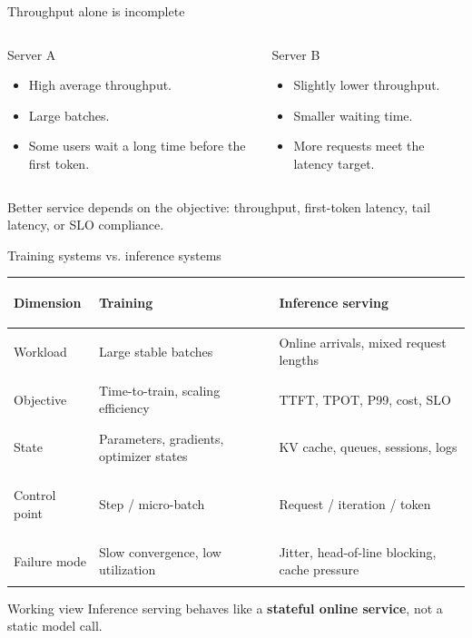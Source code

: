 \documentclass[aspectratio=169,11pt]{beamer}
\newcommand{\key}[1]{\textcolor{HUSTDeep}{\textbf{#1}}}
\begin{document}
\begin{frame}{Throughput alone is incomplete}
  \begin{columns}[T,totalwidth=\textwidth]
    \begin{column}{0.48\textwidth}
      \begin{block}{Server A}
        \begin{itemize}
          \item High average throughput.
          \item Large batches.
          \item Some users wait a long time before the first token.
        \end{itemize}
      \end{block}
    \end{column}
    \begin{column}{0.48\textwidth}
      \begin{block}{Server B}
        \begin{itemize}
          \item Slightly lower throughput.
          \item Smaller waiting time.
          \item More requests meet the latency target.
        \end{itemize}
      \end{block}
    \end{column}
  \end{columns}
  \vspace{0.35cm}
  \centering
  \large Better service depends on the objective: throughput, first-token latency, tail latency, or SLO compliance.
\end{frame}

\begin{frame}{Training systems vs. inference systems}
  \small
  \begin{tabularx}{\textwidth}{>{\bfseries\raggedright\arraybackslash}p{2.0cm}YY}
    \toprule
    Dimension & Training & Inference serving \\
    \midrule
    Workload & Large stable batches & Online arrivals, mixed request lengths \\
    Objective & Time-to-train, scaling efficiency & TTFT, TPOT, P99, cost, SLO \\
    State & Parameters, gradients, optimizer states & KV cache, queues, sessions, logs \\
    Control point & Step / micro-batch & Request / iteration / token \\
    Failure mode & Slow convergence, low utilization & Jitter, head-of-line blocking, cache pressure \\
    \bottomrule
  \end{tabularx}
  \vspace{0.28cm}
  \begin{block}{Working view}
    Inference serving behaves like a \key{stateful online service}, not a static model call.
  \end{block}
\end{frame}
\end{document}
